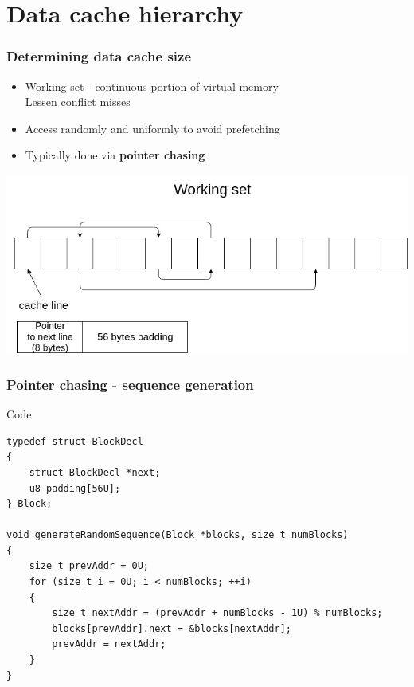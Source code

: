 \documentclass{beamer}
\begin{document}
\section{Data cache hierarchy}

\begin{frame}
\frametitle{Determining data cache size}
\begin{itemize}
\item Working set - continuous portion of virtual memory\\
      Lessen conflict misses
\item Access randomly and uniformly to avoid prefetching
\item Typically done via \textbf{pointer chasing}
\end{itemize}
\begin{center}
\includegraphics[scale=.3]{img/pchase.jpg}
\end{center}
\end{frame}

\begin{frame}[fragile]
\frametitle{Pointer chasing - sequence generation}
\begin{block}{Code}
\begin{lstlisting}[style=code]
typedef struct BlockDecl
{
    struct BlockDecl *next;
    u8 padding[56U];
} Block;

void generateRandomSequence(Block *blocks, size_t numBlocks)
{
    size_t prevAddr = 0U;
    for (size_t i = 0U; i < numBlocks; ++i)
    {
        size_t nextAddr = (prevAddr + numBlocks - 1U) % numBlocks;
        blocks[prevAddr].next = &blocks[nextAddr];
        prevAddr = nextAddr;
    }
}
\end{lstlisting}
\end{block}
\end{frame}
\end{document}
